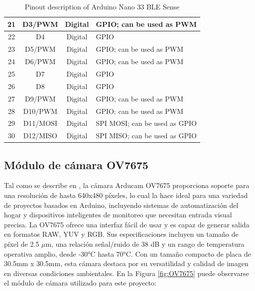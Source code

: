 \begin{table}[H]
\begin{tabular}{|c|c|c|p{8cm}|}
        \hline
        21 & D3/PWM & Digital & GPIO; can be used as PWM \\
        \hline
        22 & D4 & Digital & GPIO \\
        \hline
        23 & D5/PWM & Digital & GPIO; can be used as PWM \\
        \hline
        24 & D6/PWM & Digital & GPIO; can be used as PWM \\
        \hline
        25 & D7 & Digital & GPIO \\
        \hline
        26 & D8 & Digital & GPIO \\
        \hline
        27 & D9/PWM & Digital & GPIO; can be used as PWM \\
        \hline
        28 & D10/PWM & Digital & GPIO; can be used as PWM \\
        \hline
        29 & D11/MOSI & Digital & SPI MOSI; can be used as GPIO \\
        \hline
        30 & D12/MISO & Digital & SPI MISO; can be used as GPIO \\
        \hline
    \end{tabular}
    \caption{Pinout description of Arduino Nano 33 BLE Sense}
    \label{tab:arduino_nano_ble}
\end{table}


\subsection{Módulo de cámara OV7675}

Tal como se describe en \cite{OV}, la cámara Arducam OV7675 proporciona soporte para una resolución de hasta 640x480 píxeles, lo cual la hace ideal para una variedad de proyectos basados en Arduino, incluyendo sistemas de automatización del hogar y dispositivos inteligentes de monitoreo que necesitan entrada visual precisa. La OV7675 ofrece una interfaz fácil de usar y es capaz de generar salida en formatos RAW, YUV y RGB. Sus especificaciones incluyen un tamaño de píxel de 2.5 $\mu$m, una relación señal/ruido de 38 dB y un rango de temperatura operativa amplio, desde -30°C hasta 70°C. Con un tamaño compacto de placa de 30.5mm x 30.5mm, esta cámara destaca por su versatilidad y calidad de imagen en diversas condiciones ambientales. En la Figura \ref{fig:OV7675} puede observarse el módulo de cámara utilizado para este proyecto: 

